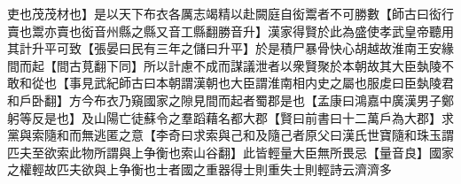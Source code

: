 吏也茂茂材也】是以天下布衣各厲志竭精以赴闕庭自衒鬻者不可勝數【師古曰衒行賣也鬻亦賣也衒音州縣之縣又音工縣翻勝音升】漢家得賢於此為盛使孝武皇帝聽用其計升平可致【張晏曰民有三年之儲曰升平】於是積尸暴骨快心胡越故淮南王安緣間而起【間古莧翻下同】所以計慮不成而謀議泄者以衆賢聚於本朝故其大臣埶陵不敢和從也【事見武紀師古曰本朝謂漢朝也大臣謂淮南相内史之屬也服䖍曰臣埶陵君和戶卧翻】方今布衣乃窺國家之隙見間而起者蜀郡是也【孟康曰鴻嘉中廣漢男子鄭躬等反是也】及山陽亡徒蘇令之羣蹈藉名都大郡【賢曰前書曰十二萬戶為大郡】求黨與索隨和而無逃匿之意【李奇曰求索與己和及隨己者原父曰漢氏世寶隨和珠玉謂匹夫至欲索此物所謂與上争衡也索山谷翻】此皆輕量大臣無所畏忌【量音良】國家之權輕故匹夫欲與上争衡也士者國之重器得士則重失士則輕詩云濟濟多